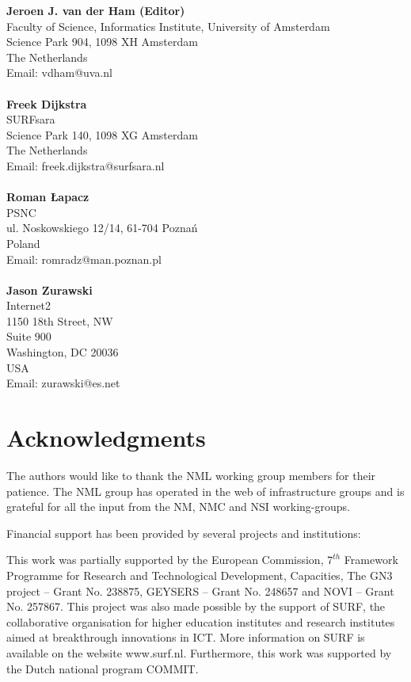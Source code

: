 \documentclass[12pt]{article}  %
\begin{document}
\textbf{Jeroen J. van der Ham (Editor)} \\
Faculty of Science, Informatics Institute, University of Amsterdam \\
Science Park 904, 1098 XH  Amsterdam  \\
The Netherlands \\
Email: vdham@uva.nl \\
\\
\textbf{Freek Dijkstra} \\
SURFsara \\
Science Park 140,  1098 XG  Amsterdam \\
The Netherlands \\
Email: freek.dijkstra@surfsara.nl \\
\\
\textbf{Roman Łapacz} \\
PSNC \\
ul. Noskowskiego 12/14,  61-704 Poznań \\
Poland \\
Email: romradz@man.poznan.pl \\
\\
\textbf{Jason Zurawski} \\
Internet2 \\
1150 18th Street, NW \\
Suite 900 \\
Washington, DC 20036 \\
USA \\
Email: zurawski@es.net %


\section{Acknowledgments}

The authors would like to thank the NML working group members for their patience.
The NML group has operated in the web of infrastructure groups and is grateful for all the input from the NM, NMC and NSI working-groups.

Financial support has been provided by several projects and institutions: 

This work was partially supported by the European Commission, $7^{th}$ Framework Programme for Research and Technological Development, Capacities,  The GN3 project -- Grant No. 238875, GEYSERS -- Grant No. 248657 and NOVI -- Grant No. 257867.
This project was also made possible by the support of SURF, the collaborative organisation for higher education institutes and research institutes aimed at breakthrough innovations in ICT. More information on SURF is available on the website www.surf.nl.
Furthermore, this work was supported by the Dutch national program COMMIT.
\end{document}
